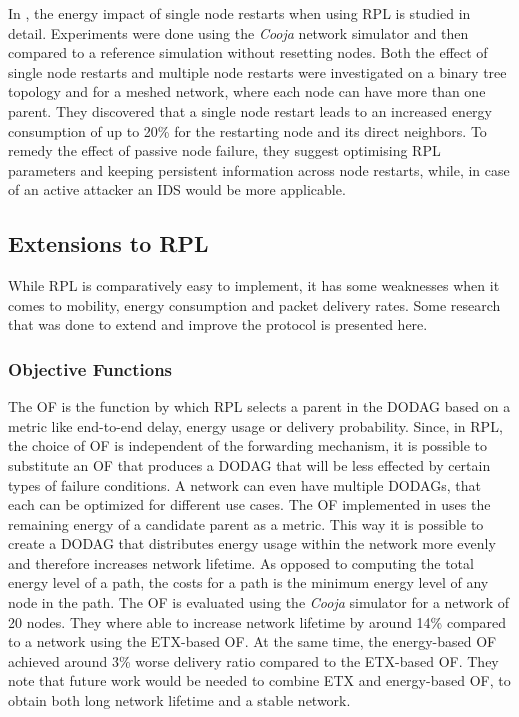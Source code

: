 \documentclass[
  a4paper,
  11pt,
  style=screen,
  extramargin,
  bcor=10mm,
  rgb,
  hyperrefdark,
  abstract=off,
  lnum,
]{tubsartcl}
\begin{document}
In \cite{kulau2017energy}, the energy impact of single node restarts when using \ac{RPL} is studied in detail.
Experiments were done using the \emph{Cooja} network simulator and then compared to a reference simulation without resetting nodes.
Both the effect of single node restarts and multiple node restarts were investigated on a binary tree topology and for a meshed network, where each node can have more than one parent.
They discovered that a single node restart leads to an increased energy consumption of up to 20\% for the restarting node and its direct neighbors.
To remedy the effect of passive node failure, they suggest optimising \ac{RPL} parameters and keeping persistent information across node restarts, while, in case of an active attacker an \ac{IDS} would be more applicable.

\subsection{Extensions to RPL}

While \ac{RPL} is comparatively easy to implement, it has some weaknesses when it comes to mobility, energy consumption and packet delivery rates.
Some research that was done to extend and improve the protocol is presented here.

\subsubsection{Objective Functions}

The \ac{OF} is the function by which \ac{RPL} selects a parent in the \ac{DODAG} based on a metric like end-to-end delay, energy usage or delivery probability.
Since, in \ac{RPL}, the choice of \ac{OF} is independent of the forwarding mechanism, it is possible to substitute an \ac{OF} that produces a \ac{DODAG} that will be less effected by certain types of failure conditions.
A network can even have multiple \acp{DODAG}, that each can be optimized for different use cases.
The \ac{OF} implemented in \cite{kamgueu2013energy} uses the remaining energy of a candidate parent as a metric.
This way it is possible to create a \ac{DODAG} that distributes energy usage within the network more evenly and therefore increases network lifetime.
As opposed to computing the total energy level of a path, the costs for a path is the minimum energy level of any node in the path.
The \ac{OF} is evaluated using the \emph{Cooja} simulator for a network of 20 nodes.
They where able to increase network lifetime by around 14\% compared to a network using the \ac{ETX}-based \ac{OF}.
At the same time, the energy-based \ac{OF} achieved around 3\% worse delivery ratio compared to the \ac{ETX}-based \ac{OF}.
They note that future work would be needed to combine \ac{ETX} and energy-based \ac{OF}, to obtain both long network lifetime and a stable network.
\end{document}

